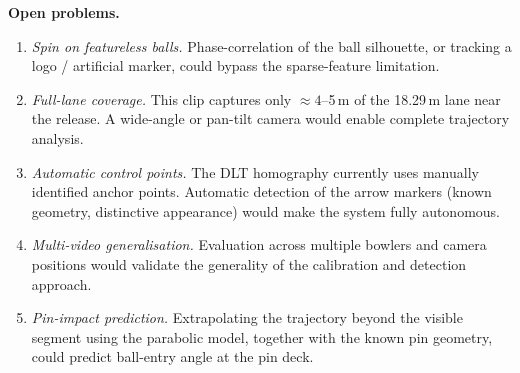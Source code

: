\documentclass[11pt,twoside]{article}
\begin{document}
\textbf{Open problems.}
\begin{enumerate}
    \item \textit{Spin on featureless balls.}
    Phase-correlation of the ball silhouette, or tracking a logo / artificial marker, could bypass the sparse-feature limitation.
    \item \textit{Full-lane coverage.}
    This clip captures only $\approx 4$--5\,m of the 18.29\,m lane near the release.
    A wide-angle or pan-tilt camera would enable complete trajectory analysis.
    \item \textit{Automatic control points.}
    The DLT homography currently uses manually identified anchor points.
    Automatic detection of the arrow markers (known geometry, distinctive appearance) would make the system fully autonomous.
    \item \textit{Multi-video generalisation.}
    Evaluation across multiple bowlers and camera positions would validate the generality of the calibration and detection approach.
    \item \textit{Pin-impact prediction.}
    Extrapolating the trajectory beyond the visible segment using the parabolic model, together with the known pin geometry, could predict ball-entry angle at the pin deck.
\end{enumerate}

{}
\end{document}
